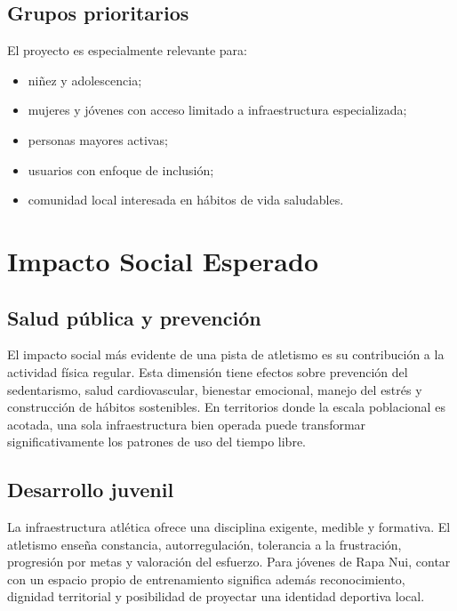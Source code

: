 \documentclass[12pt,letterpaper]{article}
\begin{document}
\subsection{Grupos prioritarios}

El proyecto es especialmente relevante para:

\begin{itemize}
    \item niñez y adolescencia;
    \item mujeres y jóvenes con acceso limitado a infraestructura especializada;
    \item personas mayores activas;
    \item usuarios con enfoque de inclusión;
    \item comunidad local interesada en hábitos de vida saludables.
\end{itemize}

\section{Impacto Social Esperado}

\subsection{Salud pública y prevención}

El impacto social más evidente de una pista de atletismo es su contribución a la actividad física regular. Esta dimensión tiene efectos sobre prevención del sedentarismo, salud cardiovascular, bienestar emocional, manejo del estrés y construcción de hábitos sostenibles. En territorios donde la escala poblacional es acotada, una sola infraestructura bien operada puede transformar significativamente los patrones de uso del tiempo libre.

\subsection{Desarrollo juvenil}

La infraestructura atlética ofrece una disciplina exigente, medible y formativa. El atletismo enseña constancia, autorregulación, tolerancia a la frustración, progresión por metas y valoración del esfuerzo. Para jóvenes de Rapa Nui, contar con un espacio propio de entrenamiento significa además reconocimiento, dignidad territorial y posibilidad de proyectar una identidad deportiva local.
\end{document}
